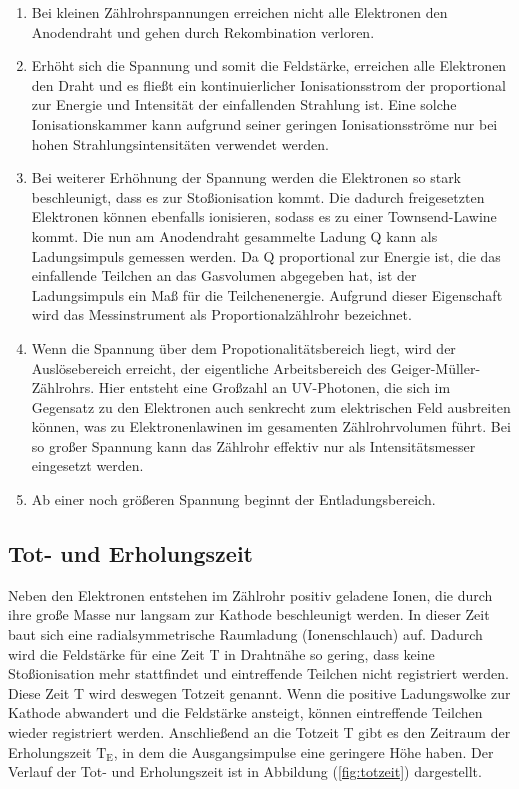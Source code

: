 \begin{enumerate}
\item Bei kleinen Zählrohrspannungen erreichen nicht alle Elektronen den Anodendraht und gehen durch Rekombination verloren.

\item Erhöht sich die Spannung und somit die Feldstärke, 
erreichen alle Elektronen den Draht und es fließt ein kontinuierlicher Ionisationsstrom der proportional zur Energie und Intensität der einfallenden Strahlung ist.
Eine solche Ionisationskammer kann aufgrund seiner geringen Ionisationsströme nur bei hohen Strahlungsintensitäten verwendet werden.

\item Bei weiterer Erhöhnung der Spannung werden die Elektronen so stark beschleunigt, dass es zur Stoßionisation kommt.
Die dadurch freigesetzten Elektronen können ebenfalls ionisieren, sodass es zu einer Townsend-Lawine kommt.
Die nun am Anodendraht gesammelte Ladung Q kann als Ladungsimpuls gemessen werden.
Da Q proportional zur Energie ist, die das einfallende Teilchen an das Gasvolumen abgegeben hat, 
ist der Ladungsimpuls ein Maß für die Teilchenenergie.
Aufgrund dieser Eigenschaft wird das Messinstrument als Proportionalzählrohr bezeichnet.

\item Wenn die Spannung über dem Propotionalitätsbereich liegt, wird der Auslösebereich erreicht, 
der eigentliche Arbeitsbereich des Geiger-Müller-Zählrohrs. 
Hier entsteht eine Großzahl an UV-Photonen, die sich im Gegensatz zu den Elektronen auch senkrecht zum elektrischen Feld ausbreiten können,
was zu Elektronenlawinen im gesamenten Zählrohrvolumen führt.
Bei so großer Spannung kann das Zählrohr effektiv nur als Intensitätsmesser eingesetzt werden. 

\item Ab einer noch größeren Spannung beginnt der Entladungsbereich.

\end{enumerate}

\subsection{Tot- und Erholungszeit}
Neben den Elektronen entstehen im Zählrohr positiv geladene Ionen, die durch ihre große Masse nur langsam zur Kathode beschleunigt werden.
In dieser Zeit baut sich eine radialsymmetrische Raumladung (Ionenschlauch) auf.
Dadurch wird die Feldstärke für eine Zeit T in Drahtnähe so gering, dass keine Stoßionisation mehr stattfindet und eintreffende Teilchen nicht registriert werden.
Diese Zeit T wird deswegen Totzeit genannt.
Wenn die positive Ladungswolke zur Kathode abwandert und die Feldstärke ansteigt, können eintreffende Teilchen wieder registriert werden.
Anschließend an die Totzeit T gibt es den Zeitraum der Erholungszeit $\text{T}_\text{E}$, in dem die Ausgangsimpulse eine geringere Höhe haben.
Der Verlauf der Tot- und Erholungszeit ist in Abbildung (\ref{fig:totzeit}) dargestellt.

